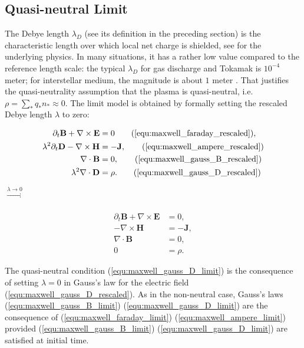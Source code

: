 \documentclass{article}
\begin{document}
\subsection{Quasi-neutral Limit} \label{sec:quasi-neutral_limit}
The Debye length $\lambda_D$ (see its definition in the preceding section) is the characteristic length over which local net charge is shielded, see \cite[Sec. 1.4]{chen2016} for the underlying physics. In many situations, it has a rather low value compared to the reference length scale: the typical $\lambda_D$ for gas discharge and Tokamak is $10^{-4}$ meter; for interstellar medium, the magnitude is about $1$ meter \cite[Ch. 20]{Blandford_2013}. That justifies the quasi-neutrality assumption that the plasma is quasi-neutral, i.e. $\rho = \sum_* q_*n_* \approx 0$. The limit model is obtained by formally setting the rescaled Debye length $\lambda$ to zero:
\vspace{-\baselineskip}
\begin{center}
    \begin{minipage}{0.3\textwidth}
    \begin{align*}
        \partial_t \mathbf{B} + \nabla \times \mathbf{E} &= 0 \tag{\ref{equ:maxwell_faraday_rescaled}},\\ 
        \lambda^2 \partial_t \mathbf{D} - \nabla \times \mathbf{H} &= - \mathbf{J}, \tag{\ref{equ:maxwell_ampere_rescaled}}\\
        \nabla \cdot \mathbf{B} &= 0, \tag{\ref{equ:maxwell_gauss_B_rescaled}}\\
        \lambda^2 \nabla \cdot \mathbf{D} &= \rho. \tag{\ref{equ:maxwell_gauss_D_rescaled}}
    \end{align*}
\end{minipage}
\hspace{0.6cm}$\xrightarrow[]{\lambda \rightarrow 0}$
\begin{minipage}{0.3\textwidth}
\begin{subequations}
\begin{align}
    \partial_t \mathbf{B} + \nabla \times \mathbf{E} &= 0, \label{equ:maxwell_faraday_limit} \\ 
    - \nabla \times \mathbf{H} &= - \mathbf{J}, \label{equ:maxwell_ampere_limit} \\
    \nabla \cdot \mathbf{B} &= 0,  \label{equ:maxwell_gauss_B_limit}\\
     0 &= \rho. \label{equ:maxwell_gauss_D_limit}
\end{align}
\end{subequations}
\end{minipage}
\end{center}
The quasi-neutral condition (\ref{equ:maxwell_gauss_D_limit}) is the consequence of setting $\lambda = 0$ in Gauss's law for the electric field (\ref{equ:maxwell_gauss_D_rescaled}). As in the non-neutral case, Gauss's laws (\ref{equ:maxwell_gauss_B_limit}) (\ref{equ:maxwell_gauss_D_limit}) are the consequence of (\ref{equ:maxwell_faraday_limit}) (\ref{equ:maxwell_ampere_limit}) provided (\ref{equ:maxwell_gauss_B_limit}) (\ref{equ:maxwell_gauss_D_limit}) are satisfied at initial time. 
\end{document}
